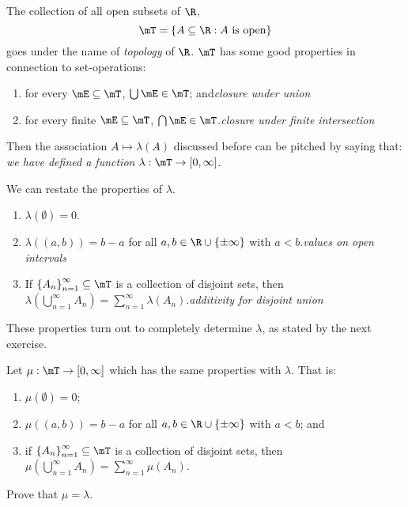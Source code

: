\documentclass[pmath450]{subfiles}
\begin{document}
    \np The collection of all open subsets of $\R$,
    \begin{equation*}
        \mT = \left\lbrace A\subseteq\R:A\text{ is open} \right\rbrace
    \end{equation*}
    goes under the name of \textit{topology} of $\R$. $\mT$ has some good properties in connection to set-operations:
    \begin{enumerate}
        \item for every $\mE\subseteq\mT$, $\bigcup\mE\in\mT$; and\hfill\textit{closure under union}
        \item for every finite $\mE\subseteq\mT$, $\bigcap\mE\in\mT$.\hfill\textit{closure under finite intersection}
    \end{enumerate}
    Then the association $A\mapsto\lambda\left( A \right)$ discussed before can be pitched by saying that: \textit{we have defined a function $\lambda:\mT\to\left[ 0,\infty \right]$}.

    \np We can restate the properties of $\lambda$.
    \begin{enumerate}
        \item $\lambda\left( \emptyset \right)=0$.
        \item $\lambda\left( \left( a,b \right) \right)=b-a$ for all $a,b\in\R\cup\left\lbrace \pm\infty \right\rbrace$ with $a<b$.\hfill\textit{values on open intervals}
        \item If $\left\lbrace A_n \right\rbrace^{\infty}_{n=1}\subseteq\mT$ is a collection of disjoint sets, then $\lambda\left( \bigcup^{\infty}_{n=1}A_n \right)=\sum^{\infty}_{n=1}\lambda\left( A_n \right)$.\hfill\textit{additivity for disjoint union}
    \end{enumerate}
    These properties turn out to completely determine $\lambda$, as stated by the next exercise.

    \begin{exercise}{}
        Let $\mu:\mT\to\left[ 0,\infty \right]$ which has the same properties with $\lambda$. That is:
        \begin{enumerate}
            \item $\mu\left( \emptyset \right)=0$;
            \item $\mu\left( \left( a,b \right) \right)=b-a$ for all $a,b\in\R\cup\left\lbrace \pm\infty \right\rbrace$ with $a<b$; and
            \item if $\left\lbrace A_n \right\rbrace^{\infty}_{n=1}\subseteq\mT$ is a collection of disjoint sets, then $\mu\left( \bigcup^{\infty}_{n=1}A_n \right)=\sum^{\infty}_{n=1}\mu\left( A_n \right)$.
        \end{enumerate}
        Prove that $\mu=\lambda$.
    \end{exercise}
\end{document}
